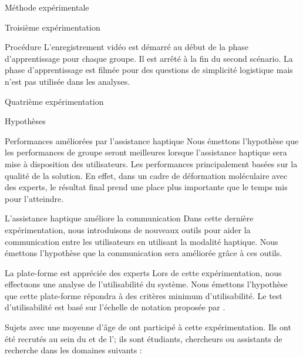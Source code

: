 \documentclass[myfrancais,ngerman,english,frenchb]{mythesis}
\begin{document}
\begin{mychapter}{Méthode expérimentale}
\begin{mysection}{Troisième expérimentation}
\begin{mysubsection}{Procédure}
				L'enregistrement vidéo est démarré au début de la phase d'apprentissage pour chaque groupe.
				Il est arrêté à la fin du second scénario.
				La phase d'apprentissage est filmée pour des questions de simplicité logistique mais n'est pas utilisée dans les analyses.
			\end{mysubsection}
		\end{mysection}
		\begin{mysection}{Quatrième expérimentation}
			\begin{mysubsection}{Hypothèses}
				\begin{myparagraph}{ Performances améliorées par l'assistance haptique}
					Nous émettons l'hypothèse que les performances de groupe seront meilleures lorsque l'assistance haptique sera mise à disposition des utilisateurs.
					Les performances principalement basées sur la qualité de la solution.
					En effet, dans un cadre de déformation moléculaire avec des experts, le résultat final prend une place plus importante que le temps mis pour l'atteindre.
				\end{myparagraph}
				\begin{myparagraph}{ L'assistance haptique améliore la communication}
					Dans cette dernière expérimentation, nous introduisons de nouveaux outils pour aider la communication entre les utilisateurs en utilisant la modalité haptique.
					Nous émettons l'hypothèse que la communication sera améliorée grâce à ces outils.
				\end{myparagraph}
				\begin{myparagraph}{ La plate-forme est appréciée des experts}
					Lors de cette expérimentation, nous effectuons une analyse de l'utilisabilité du système.
					Nous émettons l'hypothèse que cette plate-forme répondra à des critères minimum d'utilisabilité.
					Le test d'utilisabilité est basé sur l'échelle de notation proposée par .
				\end{myparagraph}
			\end{mysubsection}
			\begin{mysubsection}{Sujets}
				 avec une moyenne d'âge de  ont participé à cette expérimentation.
				Ils ont été recrutés au sein du \myCNRSLIMSI et de l'; ils sont étudiants, chercheurs ou assistants de recherche dans les domaines suivants :

\end{mysubsection}
\end{mysection}
\end{mychapter}
\end{document}
